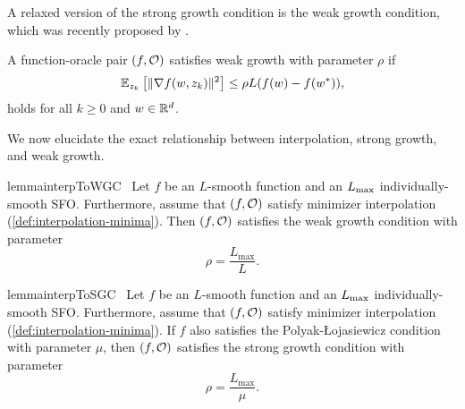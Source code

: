 A relaxed version of the strong growth condition is the weak growth condition, which was recently proposed by \citet{vaswani2019fast}.
\begin{definition}\label{def:wgc}
    A function-oracle pair \( \rbr{f, \oracle{}} \) satisfies weak growth with parameter \(\rho \) if
    \[ \Ek \sbr{\norm{\grad(\w, \zk)}^2} \leq \rho L (f(\w) - f(\wopt)), \]
    holds for all \( k \geq 0 \) and \( \w \in \R^d\).
\end{definition}

We now elucidate the exact relationship between interpolation, strong growth, and weak growth.

\begin{restatable}{lemma}{interpToWGC}~\label{thm:interpolation-to-wgc}
    Let \( f \) be an \( L \)-smooth function and \oracle{} an \( \Lmax \) individually-smooth SFO.
    Furthermore, assume that \( \rbr{f, \oracle{}} \) satisfy minimizer interpolation (\autoref{def:interpolation-minima}).
    Then \( \rbr{f, \oracle{}} \) satisfies the weak growth condition with parameter
    \[ \rho = \frac{L_{\text{max}}}{L}. \]
\end{restatable}


\begin{restatable}{lemma}{interpToSGC}~\label{thm:interpolation_to_sgc}
    Let \( f \) be an \( L \)-smooth function and \oracle{} an \( \Lmax \) individually-smooth SFO.
    Furthermore, assume that \( \rbr{f, \oracle{}} \) satisfy minimizer interpolation (\autoref{def:interpolation-minima}).
    If \( f \) also satisfies the Polyak-Łojasiewicz condition with parameter \( \mu \), then \( \rbr{f, \oracle{}} \) satisfies the strong growth condition with parameter
    \[ \rho = \frac{L_{\text{max}}}{\mu}. \]
\end{restatable}
